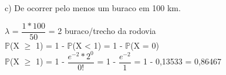 \documentclass[12pt,a4paper]{article}
\begin{document}
	c) De ocorrer pelo menos um buraco em 100 km.
	\begin{center}
		\vspace{0.5cm}
		$\lambda$ = $\dfrac{1 * 100}{50}$ = 2 buraco/trecho da rodovia
		\vspace{1cm}\\
		$\mathbb{P}$(X $\geq$ 1) = 1 - $\mathbb{P}$(X < 1) = 1 - $\mathbb{P}$(X = 0)
		\vspace{1cm}\\
		$\mathbb{P}$(X $\geq$ 1) = 1 - $\dfrac{e^{-2} * 2^0}{0!}$ = 1 - $\dfrac{e^{-2}}{1}$ = 1 - 0,13533 = 0,86467
	\end{center}
\end{document}
